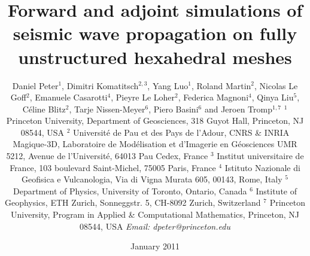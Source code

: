 \documentclass[referee,extra]{gji}
\begin{document}


\author[Peter et al.]{
\parbox[t]{1.\textwidth}{
Daniel Peter$^1$,
Dimitri Komatitsch$^{2,3}$,
Yang Luo$^1$,
Roland Martin$^2$,
Nicolas Le Goff$^2$,
Emanuele Casarotti$^4$,
Pieyre Le Loher$^2$,
Federica Magnoni$^4$,
Qinya Liu$^5$,
C\'eline Blitz$^2$,
Tarje Nissen-Meyer$^6$,
Piero Basini$^{6}$
and Jeroen Tromp$^{1,7}$
\vspace{1cm}
\newline
{\small
$^1$ Princeton University, Department of Geosciences, 318 Guyot Hall, Princeton, NJ 08544, USA \newline
$^2$ Universit\'e de Pau et des Pays de l'Adour, CNRS \& INRIA Magique-3D,
Laboratoire de Mod\'elisation et d'Imagerie en G\'eosciences UMR 5212,
Avenue de l'Universit\'e, 64013 Pau Cedex, France \newline
$^3$ Institut universitaire de France, 103 boulevard Saint-Michel, 75005 Paris, France \newline
$^4$ Istituto Nazionale di Geofisica e Vulcanologia, Via di Vigna Murata 605, 00143, Rome, Italy \newline
$^5$ Department of Physics, University of Toronto, Ontario, Canada \newline
$^6$ Institute of Geophysics, ETH Zurich, Sonneggstr. 5, CH-8092 Zurich, Switzerland \newline
$^7$ Princeton University, Program in Applied \& Computational Mathematics, Princeton, NJ 08544, USA \newline
{\it Email: dpeter@princeton.edu}
}
}
}

\title[SPECFEM3D Version~2.0]{Forward and adjoint simulations of seismic wave propagation on fully unstructured hexahedral meshes}

\date{January 2011}

\maketitle
\end{document}
